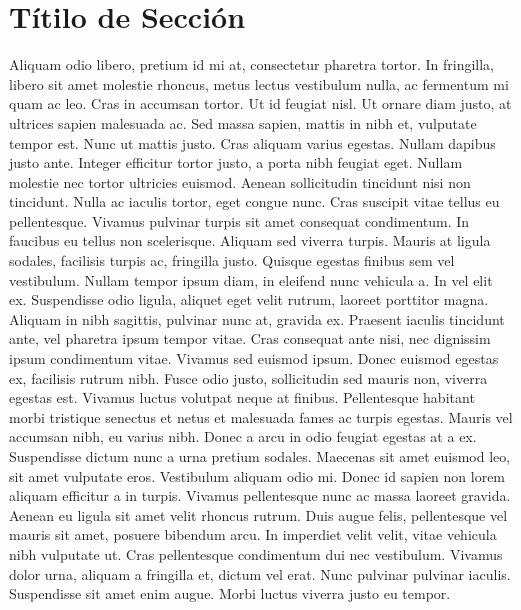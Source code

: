 \section{Títilo de Sección} 
Aliquam odio libero, pretium id mi at, consectetur
pharetra tortor. In fringilla, libero sit amet molestie rhoncus, metus lectus
vestibulum nulla, ac fermentum mi quam ac leo. Cras in accumsan tortor. Ut id
feugiat nisl. Ut ornare diam justo, at ultrices sapien malesuada ac. Sed massa
sapien, mattis in nibh et, vulputate tempor est. Nunc ut mattis justo. Cras
aliquam varius egestas. Nullam dapibus justo ante. Integer efficitur tortor
justo, a porta nibh feugiat eget. Nullam molestie nec tortor ultricies euismod.
Aenean sollicitudin tincidunt nisi non tincidunt. Nulla ac iaculis tortor, eget
congue nunc. Cras suscipit vitae tellus eu pellentesque. Vivamus pulvinar turpis
sit amet consequat condimentum. In faucibus eu tellus non scelerisque. Aliquam
sed viverra turpis. Mauris at ligula sodales, facilisis turpis ac, fringilla
justo. Quisque egestas finibus sem vel vestibulum. Nullam tempor ipsum diam, in
eleifend nunc vehicula a. In vel elit ex. Suspendisse odio ligula, aliquet eget
velit rutrum, laoreet porttitor magna. Aliquam in nibh sagittis, pulvinar nunc
at, gravida ex. Praesent iaculis tincidunt ante, vel pharetra ipsum tempor vitae.
Cras consequat ante nisi, nec dignissim ipsum condimentum vitae. Vivamus sed
euismod ipsum. Donec euismod egestas ex, facilisis rutrum nibh. Fusce odio justo,
sollicitudin sed mauris non, viverra egestas est. Vivamus luctus volutpat neque
at finibus. Pellentesque habitant morbi tristique senectus et netus et malesuada
fames ac turpis egestas. Mauris vel accumsan nibh, eu varius nibh. Donec a arcu
in odio feugiat egestas at a ex. Suspendisse dictum nunc a urna pretium sodales.
Maecenas sit amet euismod leo, sit amet vulputate eros. Vestibulum aliquam odio
mi. Donec id sapien non lorem aliquam efficitur a in turpis. Vivamus
pellentesque nunc ac massa laoreet gravida. Aenean eu ligula sit amet velit
rhoncus rutrum. Duis augue felis, pellentesque vel mauris sit amet, posuere
bibendum arcu. In imperdiet velit velit, vitae vehicula nibh vulputate ut. Cras
pellentesque condimentum dui nec vestibulum. Vivamus dolor urna, aliquam a
fringilla et, dictum vel erat. Nunc pulvinar pulvinar iaculis. Suspendisse sit
amet enim augue. Morbi luctus viverra justo eu tempor. 
